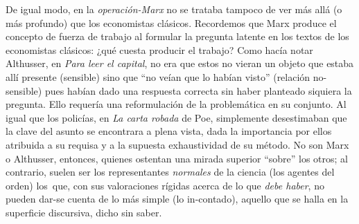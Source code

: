 De igual modo, en la \emph{operación-Marx} no se trataba tampoco de ver más allá (o más profundo) que los economistas clásicos. Recordemos que Marx produce el concepto de fuerza de trabajo al formular la pregunta latente en los textos de los economistas clásicos: ¿qué cuesta producir el trabajo? Como hacía notar Althusser, en \emph{Para leer el capital}, no era que estos no vieran un objeto que estaba allí presente (sensible) sino que \enquote{no veían que lo habían visto} (relación no-sensible) pues habían dado una respuesta correcta sin haber planteado siquiera la pregunta. Ello requería una reformulación de la problemática en su conjunto. Al igual que los policías, en \emph{La carta robada} de Poe, simplemente desestimaban que la clave del asunto se encontrara a plena vista, dada la importancia por ellos atribuida a su requisa y a la supuesta exhaustividad de su método. No son Marx o Althusser, entonces, quienes ostentan una mirada superior \enquote{sobre} los otros; al contrario, suelen ser los representantes \emph{normales} de la ciencia (los agentes del orden) los~que, con sus valoraciones rígidas acerca de lo que \emph{debe haber}, no pueden dar-se cuenta de lo más simple (lo in-contado), aquello que se halla en la superficie discursiva, dicho sin saber.

